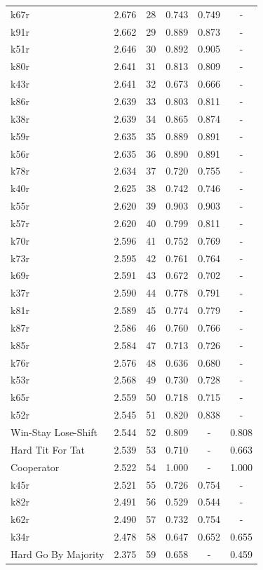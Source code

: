 \begin{tabular}{lccccc}
k67r & 2.676 & 28 & 0.743 & 0.749 & - \\
k91r & 2.662 & 29 & 0.889 & 0.873 & - \\
k51r & 2.646 & 30 & 0.892 & 0.905 & - \\
k80r & 2.641 & 31 & 0.813 & 0.809 & - \\
k43r & 2.641 & 32 & 0.673 & 0.666 & - \\
k86r & 2.639 & 33 & 0.803 & 0.811 & - \\
k38r & 2.639 & 34 & 0.865 & 0.874 & - \\
k59r & 2.635 & 35 & 0.889 & 0.891 & - \\
k56r & 2.635 & 36 & 0.890 & 0.891 & - \\
k78r & 2.634 & 37 & 0.720 & 0.755 & - \\
k40r & 2.625 & 38 & 0.742 & 0.746 & - \\
k55r & 2.620 & 39 & 0.903 & 0.903 & - \\
k57r & 2.620 & 40 & 0.799 & 0.811 & - \\
k70r & 2.596 & 41 & 0.752 & 0.769 & - \\
k73r & 2.595 & 42 & 0.761 & 0.764 & - \\
k69r & 2.591 & 43 & 0.672 & 0.702 & - \\
k37r & 2.590 & 44 & 0.778 & 0.791 & - \\
k81r & 2.589 & 45 & 0.774 & 0.779 & - \\
k87r & 2.586 & 46 & 0.760 & 0.766 & - \\
k85r & 2.584 & 47 & 0.713 & 0.726 & - \\
k76r & 2.576 & 48 & 0.636 & 0.680 & - \\
k53r & 2.568 & 49 & 0.730 & 0.728 & - \\
k65r & 2.559 & 50 & 0.718 & 0.715 & - \\
k52r & 2.545 & 51 & 0.820 & 0.838 & - \\
Win-Stay Lose-Shift & 2.544 & 52 & 0.809 & - & 0.808 \\
Hard Tit For Tat & 2.539 & 53 & 0.710 & - & 0.663 \\
Cooperator & 2.522 & 54 & 1.000 & - & 1.000 \\
k45r & 2.521 & 55 & 0.726 & 0.754 & - \\
k82r & 2.491 & 56 & 0.529 & 0.544 & - \\
k62r & 2.490 & 57 & 0.732 & 0.754 & - \\
k34r & 2.478 & 58 & 0.647 & 0.652 & 0.655 \\
Hard Go By Majority & 2.375 & 59 & 0.658 & - & 0.459 \\

\end{tabular}
